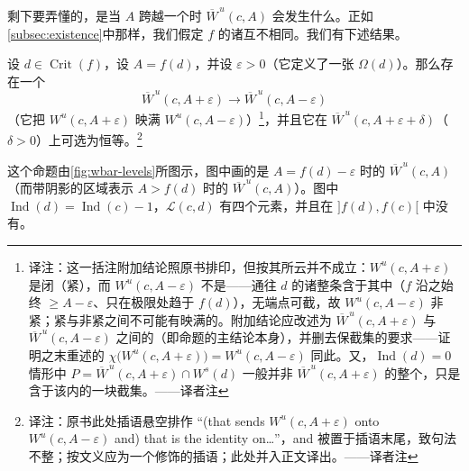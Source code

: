 剩下要弄懂的，是当 $A$ 跨越一个\trCriticalValue{}时 $\overline{W}^{\,u}(c,A)$ 会发生什么。正如\cref{subsec:existence}中那样，我们假定 $f$ 的诸\trCriticalValue{}互不相同。我们有下述结果。

\begin{proposition}\label{thm:crossing-critical-value-homeomorphism}
设 $d\in\operatorname{Crit}(f)$，设 $A=f(d)$，并设 $\varepsilon>0$（它定义了一张\trMorseChart{} $\Omega(d)$）。那么存在一个\trHomeomorphism
\[
\overline{W}^{\,u}(c,A+\varepsilon)\longrightarrow\overline{W}^{\,u}(c,A-\varepsilon)
\]
（它把 $W^u(c,A+\varepsilon)$ 映满 $W^u(c,A-\varepsilon)$）\footnote{译注：这一括注附加结论照原书排印，但按其所云并不成立：$W^u(c,A+\varepsilon)$ 是闭\trDisk{}（紧），而 $W^u(c,A-\varepsilon)$ 不是——通往 $d$ 的诸\trTrajectory{}整条含于其中（$f$ 沿之始终 $\ge A-\varepsilon$、只在极限处趋于 $f(d)$），无端点可截，故 $W^u(c,A-\varepsilon)$ 非紧；紧与非紧之间不可能有映满的\trHomeomorphism。附加结论应改述为\trClosed\trCellular{} $\overline{W}^{\,u}(c,A+\varepsilon)$ 与 $\overline{W}^{\,u}(c,A-\varepsilon)$ 之间的\trHomeomorphism（即命题的主结论本身），并删去保截集的要求——证明之末重述的 $\chi\bigl(W^u(c,A+\varepsilon)\bigr)=W^u(c,A-\varepsilon)$ 同此。又，$\operatorname{Ind}(d)=0$ 情形中 $P=\overline{W}^{\,u}(c,A+\varepsilon)\cap W^s(d)$ 一般并非 $\overline{W}^{\,u}(c,A+\varepsilon)$ 的整个\trConnectedComponent，只是含于该\trClosed\trCellular{}内的一块截集。——译者注}，并且它在 $\overline{W}^{\,u}(c,A+\varepsilon+\delta)$（$\delta>0$）上可选为恒等。\footnote{译注：原书此处插语悬空排作 “(that sends $W^u(c,A+\varepsilon)$ onto $W^u(c,A-\varepsilon)$ and) that is the identity on…”，and 被置于插语末尾，致句法不整；按文义应为一个修饰\trHomeomorphic{}的插语；此处并入正文译出。——译者注}
\end{proposition}

这个命题由\cref{fig:wbar-levels}所图示，图中画的是 $A=f(d)-\varepsilon$ 时的 $\overline{W}^{\,u}(c,A)$（而带阴影的区域表示 $A>f(d)$ 时的 $\overline{W}^{\,u}(c,A)$）。图中 $\operatorname{Ind}(d)=\operatorname{Ind}(c)-1$，$\mathcal{L}(c,d)$ 有四个元素，并且在 $]f(d),f(c)[$ 中没有\trCriticalValue。

